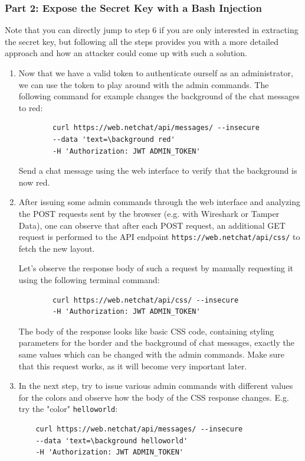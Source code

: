 \documentclass[12pt,a4paper]{article}
\newcommand{\code}[1]{\texttt{#1}}
\begin{document}
\subsubsection{Part 2: Expose the Secret Key with a Bash Injection}

Note that you can directly jump to step 6 if you are only interested in extracting the secret key, but following all the steps provides you with a more detailed approach and how an attacker could come up with such a solution.

\begin{enumerate}
	\item Now that we have a valid token to authenticate ourself as an administrator, we can use the token to play around with the admin commands. The following command for example changes the background of the chat messages to red:
	\begin{verbatim}
		curl https://web.netchat/api/messages/ --insecure
		--data 'text=\background red'
		-H 'Authorization: JWT ADMIN_TOKEN'
	\end{verbatim}
	
	Send a chat message using the web interface to verify that the background is now red.
	
	\item After issuing some admin commands through the web interface and analyzing the POST requests sent by the browser (e.g. with Wireshark or Tamper Data), one can observe that after each POST request, an additional GET request is performed to the API endpoint \code{https://web.netchat/api/css/} to fetch the new layout.
	
	Let's observe the response body of such a request by manually requesting it using the following terminal command:
	\begin{verbatim}
		curl https://web.netchat/api/css/ --insecure
		-H 'Authorization: JWT ADMIN_TOKEN' 
	\end{verbatim}
	
	The body of the response looks like basic CSS code, containing styling parameters for the border and the background of chat messages, exactly the same values which can be changed with the admin commands. Make sure that this request works, as it will become very important later.
	
	\item In the next step, try to issue various admin commands with different values for the colors and observe how the body of the CSS response changes. E.g. try the "color" \code{helloworld}:
	\begin{verbatim}
	curl https://web.netchat/api/messages/ --insecure
	--data 'text=\background helloworld'
	-H 'Authorization: JWT ADMIN_TOKEN'
	\end{verbatim}
	

\end{enumerate}
\end{document}
